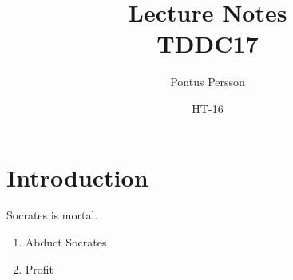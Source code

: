 \documentclass[a4paper]{article}
\author{Pontus Persson}
\title{Lecture Notes\\TDDC17}
\date{HT-16}
\begin{document}
\maketitle
\tableofcontents
\section{Introduction}
Socrates is mortal.
\begin{enumerate}
  \item Abduct Socrates
  \item Profit
\end{enumerate}
\end{document}
